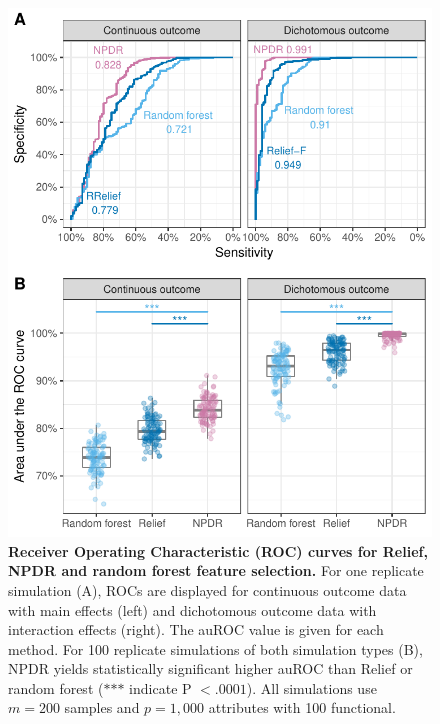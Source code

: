 \documentclass{article}
\begin{document}
\begin{figure}[h]%
\centerline{\includegraphics[]{../figs/roc_compare_100.pdf}}
\caption{\textbf{Receiver Operating Characteristic (ROC) curves for Relief, NPDR and random forest feature selection.} For one replicate simulation (A), ROCs are displayed for continuous outcome data with main effects (left) and dichotomous outcome data with interaction effects (right). The auROC value is given for each method. For 100 replicate simulations of both simulation types (B), NPDR yields statistically significant higher auROC than Relief or random forest ($\ast$$\ast$$\ast$ indicate P $<.0001$). All simulations use $m = 200$ samples and $p = 1,000$ attributes with 100 functional.}
\label{fig:auROC}
\end{figure}
\end{document}
